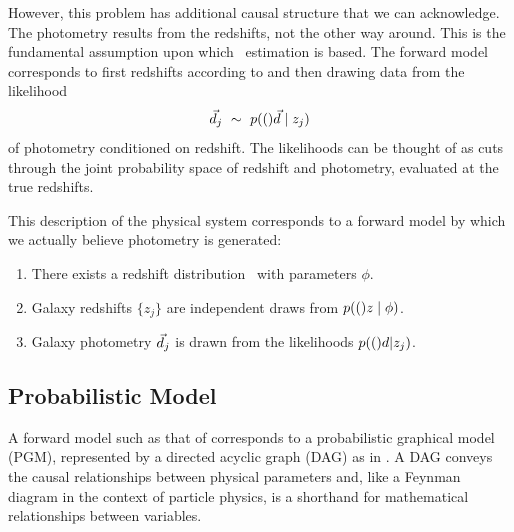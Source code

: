 However, this problem has additional causal structure that we can acknowledge.
The photometry results from the redshifts, not the other way around.
This is the fundamental assumption upon which \pz\ estimation is based.
The forward model corresponds to first redshifts according to  and then drawing data from the likelihood
\begin{equation}
\label{eqn:pzpdf}
\vec{d}_{j}\ \sim\ p(()\vec{d} \mid z_{j})
\end{equation}
of photometry conditioned on redshift.
The likelihoods can be thought of as cuts through the joint probability space of redshift and photometry, evaluated at the true redshifts.

This description of the physical system corresponds to a forward model by which we actually believe photometry is generated:
\begin{enumerate}
	\item There exists a redshift distribution \nz\ with parameters $\phi$.
	\item Galaxy redshifts $\{z_{j}\}$ are independent draws from $p(()z \mid \phi)$.
	\item Galaxy photometry $\vec{d}_{j}$ is drawn from the likelihoods $p(()d | z_{j})$.
\end{enumerate}

\subsection{Probabilistic Model}

A forward model such as that of  corresponds to a probabilistic graphical model (PGM), represented by a directed acyclic graph (DAG) as in .
A DAG conveys the causal relationships between physical parameters and, like a Feynman diagram in the context of particle physics, is a shorthand for mathematical relationships between variables.

